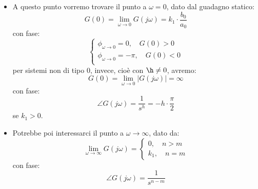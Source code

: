 \documentclass[a4paper,11pt]{article}
\begin{document}
\begin{enumerate}
		\begin{itemize}
			\item 
		A questo punto vorremo trovare il punto a $\omega = 0$, dato dal guadagno statico:
		$$
			G(0) = \lim_{\omega \rightarrow 0} G(j \omega) = k_1 \cdot \frac{b_0}{a_0}
		$$
		con fase:
		\[
			\begin{cases}
				\phi_{\omega \rightarrow 0} = 0, \quad G(0) > 0 \\	
				\phi_{\omega \rightarrow 0} = -\pi, \quad G(0) < 0 \\	
			\end{cases}
		\]
		per sistemi non di tipo $0$, invece, cioè con $\h \neq 0$, avremo:
		$$
			G(0) = \lim_{\omega \rightarrow 0} |G(j\omega)| = \infty
		$$
		con fase:
		$$
		\angle G(j\omega) = \frac{1}{s^h} = -h \cdot \frac{\pi}{2}
		$$
		se $k_1 > 0$.
	\item 
		Potrebbe poi interessarci il punto a $\omega \rightarrow \infty$, dato da:
		\[
				\lim_{\omega \rightarrow \infty} G(j\omega) = 	
			\begin{cases}
				0, \quad n > m \\
				k_1, \quad n = m
			\end{cases}
		\]
		con fase:
		$$
		\angle G(j\omega) = \frac{1}{s^{n - m}}
		$$
\end{itemize}
\end{enumerate}
\end{document}
